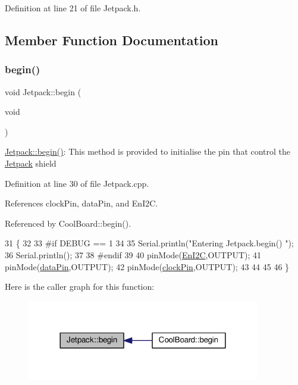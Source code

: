 Definition at line 21 of file Jetpack.\+h.



\subsection{Member Function Documentation}
\mbox{\label{classJetpack_a5a53e1ebf7aaf3bf3e0d37ea64ca09a7}} 
\subsubsection{\texorpdfstring{begin()}{begin()}}
{\footnotesize\ttfamily void Jetpack\+::begin (\begin{DoxyParamCaption}\item[{void}]{ }\end{DoxyParamCaption})}

\hyperlink{classJetpack_a5a53e1ebf7aaf3bf3e0d37ea64ca09a7}{Jetpack\+::begin()}\+: This method is provided to initialise the pin that control the \hyperlink{classJetpack}{Jetpack} shield 

Definition at line 30 of file Jetpack.\+cpp.



References clock\+Pin, data\+Pin, and En\+I2C.



Referenced by Cool\+Board\+::begin().


\begin{DoxyCode}
31 \{
32 
33 \textcolor{preprocessor}{#if DEBUG == 1 }
34  
35     Serial.println(\textcolor{stringliteral}{"Entering Jetpack.begin() "});
36     Serial.println();
37 
38 \textcolor{preprocessor}{#endif}
39 
40     pinMode(\hyperlink{classJetpack_a81df984fb4cea98c71aa1a1cfcdfe814}{EnI2C},OUTPUT);
41     pinMode(\hyperlink{classJetpack_a3d669a56e93c71dd25f970d4ed7d0c00}{dataPin},OUTPUT);
42     pinMode(\hyperlink{classJetpack_a58ebb991f358f3ae94e82148b0221b5a}{clockPin},OUTPUT);
43     
44     
45 
46 \}
\end{DoxyCode}
Here is the caller graph for this function\+:\nopagebreak
\begin{figure}[H]
\begin{center}
\leavevmode
\includegraphics[width=288pt]{classJetpack_a5a53e1ebf7aaf3bf3e0d37ea64ca09a7_icgraph}
\end{center}
\end{figure}
\mbox{\label{classJetpack_ab065ee83e244265a2223a22f3ee4a719}} 
